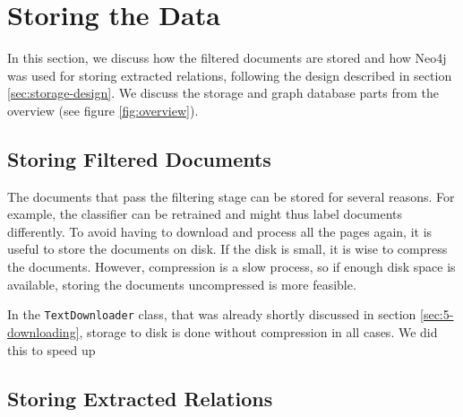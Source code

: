 \section{Storing the Data}\label{sec: 5-storing}
In this section, we discuss how the filtered documents are stored and how Neo4j was used for storing extracted relations, following the design described in section \ref{sec:storage-design}. We discuss the storage and graph database parts from the overview (see figure \ref{fig:overview}).

\subsection{Storing Filtered Documents}
The documents that pass the filtering stage can be stored for several reasons. For example, the classifier can be retrained and might thus label documents differently. To avoid having to download and process all the pages again, it is useful to store the documents on disk. If the disk is small, it is wise to compress the documents. However, compression is a slow process, so if enough disk space is available, storing the documents uncompressed is more feasible.

In the \texttt{TextDownloader} class, that was already shortly discussed in section \ref{sec:5-downloading}, storage to disk is done without compression in all cases. We did this to speed up 
\subsection{Storing Extracted Relations}
